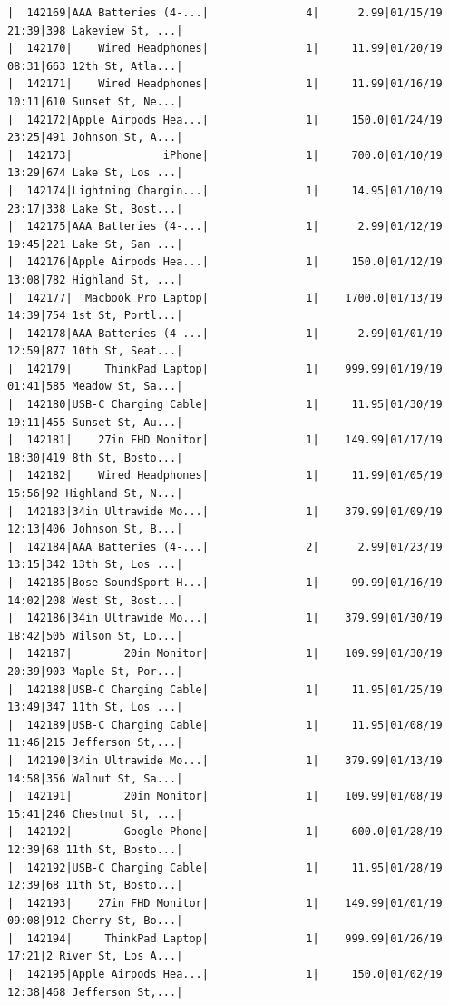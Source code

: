 \documentclass[
  letterpaper,
  DIV=11,
  numbers=noendperiod]{scrartcl}
\begin{document}
\begin{verbatim}
|  142169|AAA Batteries (4-...|               4|      2.99|01/15/19 21:39|398 Lakeview St, ...|
|  142170|    Wired Headphones|               1|     11.99|01/20/19 08:31|663 12th St, Atla...|
|  142171|    Wired Headphones|               1|     11.99|01/16/19 10:11|610 Sunset St, Ne...|
|  142172|Apple Airpods Hea...|               1|     150.0|01/24/19 23:25|491 Johnson St, A...|
|  142173|              iPhone|               1|     700.0|01/10/19 13:29|674 Lake St, Los ...|
|  142174|Lightning Chargin...|               1|     14.95|01/10/19 23:17|338 Lake St, Bost...|
|  142175|AAA Batteries (4-...|               1|      2.99|01/12/19 19:45|221 Lake St, San ...|
|  142176|Apple Airpods Hea...|               1|     150.0|01/12/19 13:08|782 Highland St, ...|
|  142177|  Macbook Pro Laptop|               1|    1700.0|01/13/19 14:39|754 1st St, Portl...|
|  142178|AAA Batteries (4-...|               1|      2.99|01/01/19 12:59|877 10th St, Seat...|
|  142179|     ThinkPad Laptop|               1|    999.99|01/19/19 01:41|585 Meadow St, Sa...|
|  142180|USB-C Charging Cable|               1|     11.95|01/30/19 19:11|455 Sunset St, Au...|
|  142181|    27in FHD Monitor|               1|    149.99|01/17/19 18:30|419 8th St, Bosto...|
|  142182|    Wired Headphones|               1|     11.99|01/05/19 15:56|92 Highland St, N...|
|  142183|34in Ultrawide Mo...|               1|    379.99|01/09/19 12:13|406 Johnson St, B...|
|  142184|AAA Batteries (4-...|               2|      2.99|01/23/19 13:15|342 13th St, Los ...|
|  142185|Bose SoundSport H...|               1|     99.99|01/16/19 14:02|208 West St, Bost...|
|  142186|34in Ultrawide Mo...|               1|    379.99|01/30/19 18:42|505 Wilson St, Lo...|
|  142187|        20in Monitor|               1|    109.99|01/30/19 20:39|903 Maple St, Por...|
|  142188|USB-C Charging Cable|               1|     11.95|01/25/19 13:49|347 11th St, Los ...|
|  142189|USB-C Charging Cable|               1|     11.95|01/08/19 11:46|215 Jefferson St,...|
|  142190|34in Ultrawide Mo...|               1|    379.99|01/13/19 14:58|356 Walnut St, Sa...|
|  142191|        20in Monitor|               1|    109.99|01/08/19 15:41|246 Chestnut St, ...|
|  142192|        Google Phone|               1|     600.0|01/28/19 12:39|68 11th St, Bosto...|
|  142192|USB-C Charging Cable|               1|     11.95|01/28/19 12:39|68 11th St, Bosto...|
|  142193|    27in FHD Monitor|               1|    149.99|01/01/19 09:08|912 Cherry St, Bo...|
|  142194|     ThinkPad Laptop|               1|    999.99|01/26/19 17:21|2 River St, Los A...|
|  142195|Apple Airpods Hea...|               1|     150.0|01/02/19 12:38|468 Jefferson St,...|

\end{verbatim}
\end{document}
